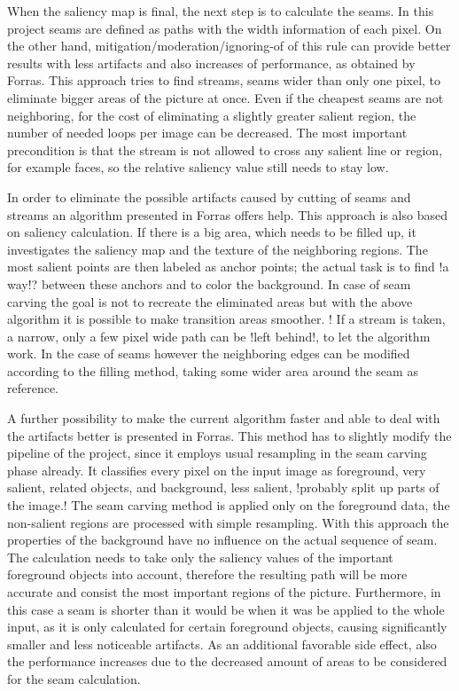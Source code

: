 \documentclass[draft,final]{vutinfth} %
\begin{document}
	When the saliency map is final, the next step is to calculate the seams.
	In this project seams are defined as paths with the width information of each pixel.
	On the other hand,  mitigation/moderation/ignoring-of of this rule can provide better results with less artifacts and also increases of performance, as obtained by Forras.
	This approach tries to find streams, seams wider than only one pixel, to eliminate bigger areas of the picture at once.
	Even if the cheapest seams are not neighboring, for the cost of eliminating a slightly greater salient region, the number of needed loops per image can be decreased.
	The most important precondition is that the stream is not allowed to cross any salient line or region, for example faces, so the relative saliency value still needs to stay low. \par
	In order to eliminate the possible artifacts caused by cutting of seams and streams an algorithm presented in Forras offers help.
	This approach is also based on saliency calculation.
	If there is a big area, which needs to be filled up, it investigates the saliency map and the texture of the neighboring regions.
	The most salient points are then labeled as anchor points; the actual task is to find !a way!? between these anchors and to color the background.
	In case of seam carving the goal is not to recreate the eliminated areas but with the above algorithm it is possible to make transition areas smoother.
	! If a stream is taken, a narrow, only a few pixel wide path can be !left behind!, to let the algorithm work.
	In the case of seams however the neighboring edges can be modified according to the filling method, taking some wider area around the seam as reference.\par 
	A further possibility to make the current algorithm faster and able to deal with the artifacts better is presented in Forras.
	This method has to slightly modify the pipeline of the project, since it employs usual resampling in the seam carving phase already.
	It classifies every pixel on the input image as foreground, very salient, related objects, and background, less salient, !probably split up parts of the image.!
	The seam carving method is applied only on the foreground data, the non-salient regions are processed with simple resampling. 
	With this approach the properties of the background have no influence on the actual sequence of seam.
	The calculation needs to take only the saliency values of the important foreground objects into account, therefore the resulting path will be more accurate and consist the most important regions of the picture.
	Furthermore, in this case a seam is shorter than it would be when it was be applied to the whole input, as it is only calculated for certain foreground objects, causing significantly smaller and less noticeable artifacts.
	As an additional favorable side effect, also the performance increases due to the decreased amount of areas to be considered for the seam calculation.    
	
\end{document}
